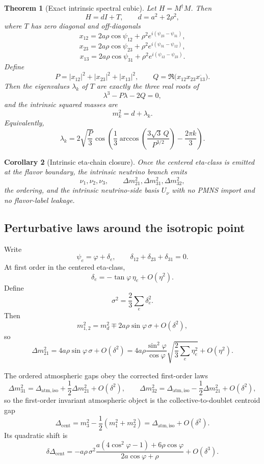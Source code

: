 \documentclass[11pt]{article}
\newtheorem{theorem}{Theorem}[section]
\newtheorem{corollary}[theorem]{Corollary}
\begin{document}
\begin{theorem}[Exact intrinsic spectral cubic]
Let \(H=M^\dagger M\). Then
\[
H=dI+T,
\qquad
d=a^2+2\rho^2,
\]
where \(T\) has zero diagonal and off-diagonals
\[
x_{12}=2a\rho\cos\psi_{12}+\rho^2e^{i(\psi_{23}-\psi_{31})},
\]
\[
x_{23}=2a\rho\cos\psi_{23}+\rho^2e^{i(\psi_{31}-\psi_{12})},
\]
\[
x_{13}=2a\rho\cos\psi_{31}+\rho^2e^{i(\psi_{12}-\psi_{23})}.
\]
Define
\[
P=|x_{12}|^2+|x_{23}|^2+|x_{13}|^2,
\qquad
Q=\Re\!\bigl(x_{12}x_{23}\overline{x_{13}}\bigr).
\]
Then the eigenvalues \(\lambda_k\) of \(T\) are exactly the three real roots of
\[
\lambda^3-P\lambda-2Q=0,
\]
and the intrinsic squared masses are
\[
m_k^2=d+\lambda_k.
\]
Equivalently,
\[
\lambda_k=
2\sqrt{\frac{P}{3}}
\cos\!\left(
\frac13\arccos\!\left(\frac{3\sqrt3\,Q}{P^{3/2}}\right)-\frac{2\pi k}{3}
\right).
\]
\end{theorem}

\begin{corollary}[Intrinsic eta-chain closure]
Once the centered eta-class is emitted at the flavor boundary, the intrinsic neutrino branch
emits
\[
\nu_1,\nu_2,\nu_3,\qquad
\Delta m_{21}^2,\Delta m_{31}^2,\Delta m_{32}^2,
\]
the ordering, and the intrinsic neutrino-side basis \(U_\nu\) with no PMNS import and no
flavor-label leakage.
\end{corollary}

\subsection{Perturbative laws around the isotropic point}

Write
\[
\psi_e=\varphi+\delta_e,
\qquad
\delta_{12}+\delta_{23}+\delta_{31}=0.
\]
At first order in the centered eta-class,
\[
\delta_e=-\tan\varphi\,\eta_e+O(\eta^2).
\]
Define
\[
\sigma^2=\frac23\sum_e \delta_e^2.
\]
Then
\[
m_{1,2}^2=m_d^2\mp 2a\rho\sin\varphi\,\sigma+O(\delta^2),
\]
so
\[
\Delta m_{21}^2 = 4a\rho\sin\varphi\,\sigma+O(\delta^2)
=4a\rho\frac{\sin^2\varphi}{\cos\varphi}
\sqrt{\frac23\sum_e\eta_e^2}+O(\eta^2).
\]

The ordered atmospheric gaps obey the corrected first-order laws
\[
\Delta m_{31}^2 = \Delta_{\mathrm{atm,iso}} + \frac12\Delta m_{21}^2 + O(\delta^2),
\qquad
\Delta m_{32}^2 = \Delta_{\mathrm{atm,iso}} - \frac12\Delta m_{21}^2 + O(\delta^2),
\]
so the first-order invariant atmospheric object is the collective-to-doublet centroid gap
\[
\Delta_{\mathrm{cent}}=
m_3^2-\frac12(m_1^2+m_2^2)
=
\Delta_{\mathrm{atm,iso}}+O(\delta^2).
\]
Its quadratic shift is
\[
\delta\Delta_{\mathrm{cent}}
=
-
a\rho\,\sigma^2
\frac{a(4\cos^2\varphi-1)+6\rho\cos\varphi}
     {2a\cos\varphi+\rho}
+O(\delta^3).
\]
\end{document}
